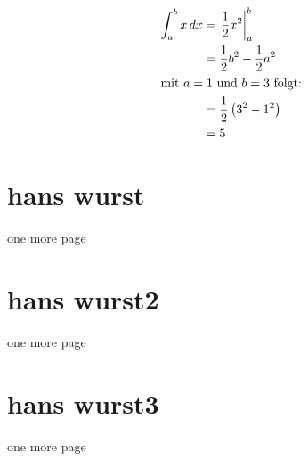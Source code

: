 \begin{align}
 \int_{a}^{b} x\,dx
 & = \left.\frac{1}{2} x^2\right\vert_{a}^{b}\\
 & = \frac{1}{2} b^2 - \frac{1}{2} a^2 \\
 \intertext{mit $a=1$ und $b=3$ folgt:}
 \notag
 & = \frac{1}{2} \left(3^2 - 1^2\right)\\
 & = 5
\end{align}

\section{hans wurst}
one more page

\section{hans wurst2}
one more page

\section{hans wurst3}
one more page \autocite[Vgl.][]{braun:scala,fab:vorlage}

